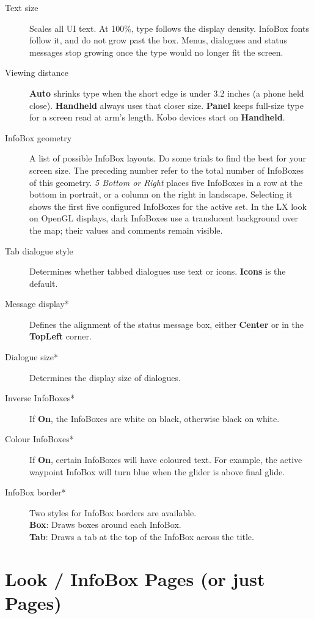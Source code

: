 \begin{description}
\item[Text size]  Scales all UI text. At 100\%, type follows the
  display density. InfoBox fonts follow it, and do not grow past
  the box. Menus, dialogues and status messages stop growing once
  the type would no longer fit the screen.
\item[Viewing distance]  {\bf Auto} shrinks type when the short edge
  is under 3.2 inches (a phone held close). {\bf Handheld} always
  uses that closer size. {\bf Panel} keeps full-size type for a
  screen read at arm's length. Kobo devices start on {\bf Handheld}.
\item[InfoBox geometry]  A list of possible InfoBox layouts. Do some trials to find the 
  best for your screen size. The preceding number refer to the total number of 
  InfoBoxes of this geometry.
  \emph{5 Bottom or Right} places five InfoBoxes in a row at the bottom
  in portrait, or a column on the right in landscape. Selecting it
  shows the first five configured InfoBoxes for the active set.
  In the LX look on OpenGL displays, dark InfoBoxes use a translucent
  background over the map; their values and comments remain visible.
\item[Tab dialogue style]  Determines whether tabbed dialogues use text or icons.
  {\bf Icons} is the default.
\item[Message display*]  Defines the alignment of the status message box, either 
  {\bf Center} or in the {\bf TopLeft} corner.
\item[Dialogue size*]  Determines the display size of dialogues.
\item[Inverse InfoBoxes*]  If {\bf On}, the InfoBoxes are white on black, otherwise 
  black on white.
\item[Colour InfoBoxes*]  If {\bf On}, certain InfoBoxes will have coloured text. For 
  example, the active waypoint InfoBox will turn blue when the glider is above final 
  glide.
\item[InfoBox border*]  Two styles for InfoBox borders are available. \\
  {\bf Box}: Draws boxes around each InfoBox. \\
  {\bf Tab}: Draws a tab at the top of the InfoBox across the
  title. \\
\end{description}


\section{Look / InfoBox Pages (or just Pages)}\label{conf:screenpages}


